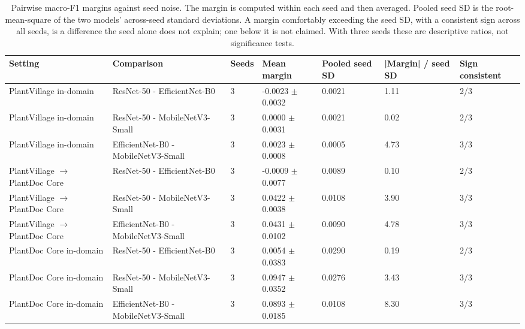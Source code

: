 \begin{table}[htbp]
\caption{Pairwise macro-F1 margins against seed noise. The margin is computed within each seed and then averaged. Pooled seed SD is the root-mean-square of the two models' across-seed standard deviations. A margin comfortably exceeding the seed SD, with a consistent sign across all seeds, is a difference the seed alone does not explain; one below it is not claimed. With three seeds these are descriptive ratios, not significance tests.}
\label{tab:ranking-margins}
\tiny
\centering
\begin{tabular}{lllllll}
\toprule
Setting & Comparison & Seeds & Mean margin & Pooled seed SD & |Margin| / seed SD & Sign consistent \\
\midrule
PlantVillage in-domain & ResNet-50 - EfficientNet-B0 & 3 & -0.0023 $\pm$ 0.0032 & 0.0021 & 1.11 & 2/3 \\
PlantVillage in-domain & ResNet-50 - MobileNetV3-Small & 3 & 0.0000 $\pm$ 0.0031 & 0.0021 & 0.02 & 2/3 \\
PlantVillage in-domain & EfficientNet-B0 - MobileNetV3-Small & 3 & 0.0023 $\pm$ 0.0008 & 0.0005 & 4.73 & 3/3 \\
PlantVillage $\rightarrow$ PlantDoc Core & ResNet-50 - EfficientNet-B0 & 3 & -0.0009 $\pm$ 0.0077 & 0.0089 & 0.10 & 2/3 \\
PlantVillage $\rightarrow$ PlantDoc Core & ResNet-50 - MobileNetV3-Small & 3 & 0.0422 $\pm$ 0.0038 & 0.0108 & 3.90 & 3/3 \\
PlantVillage $\rightarrow$ PlantDoc Core & EfficientNet-B0 - MobileNetV3-Small & 3 & 0.0431 $\pm$ 0.0102 & 0.0090 & 4.78 & 3/3 \\
PlantDoc Core in-domain & ResNet-50 - EfficientNet-B0 & 3 & 0.0054 $\pm$ 0.0383 & 0.0290 & 0.19 & 2/3 \\
PlantDoc Core in-domain & ResNet-50 - MobileNetV3-Small & 3 & 0.0947 $\pm$ 0.0352 & 0.0276 & 3.43 & 3/3 \\
PlantDoc Core in-domain & EfficientNet-B0 - MobileNetV3-Small & 3 & 0.0893 $\pm$ 0.0185 & 0.0108 & 8.30 & 3/3 \\
\bottomrule
\end{tabular}
\end{table}
